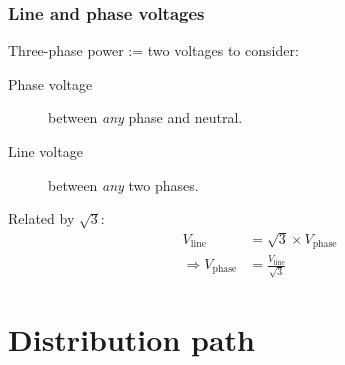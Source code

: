 \documentclass{pgslides}
\begin{document}
\subsubsection{Line and phase voltages}

\begin{frame}{\insertsubsubsectionhead}
Three-phase power :=  two voltages to consider:
\begin{description}
\item[Phase voltage] between \textit{any} phase and neutral.
\item[Line voltage] between \textit{any} two phases.
\end{description}

Related by $\sqrt{3}$:
\begin{align}
  V_{\mbox{line}} & = \sqrt{3} \times V_{\mbox{phase}}\\
\Rightarrow  V_{\mbox{phase}} & = \frac{V_{\mbox{line}}}{\sqrt{3}}                     
\end{align}
\end{frame}



\newpage
\section{Distribution path}
\end{document}
